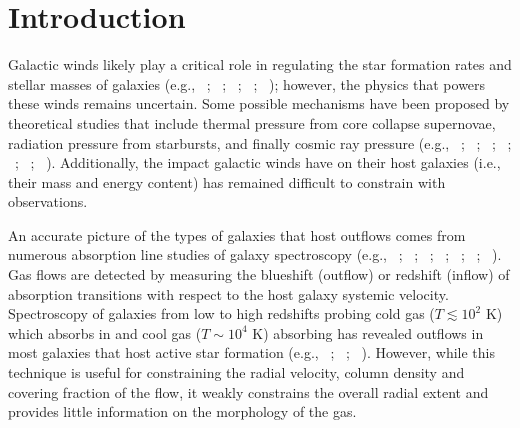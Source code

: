 \documentclass[twocolumn]{aastex62}
\newcommand{\citethnop}[1]{\citeauthor{#1}\ \citeyear{#1}}
\begin{document}

\section{Introduction}\label{sec:intro}
Galactic winds likely play a critical role in regulating the star formation rates and stellar masses of galaxies (e.g., \citethnop{SP1999}; \citethnop{Keres2009}; \citethnop{Oppenheimer2010}; \citethnop{Hopkins2014}; \citethnop{Werk_2014}); however, the physics that powers these winds remains uncertain. Some possible mechanisms have been proposed by theoretical studies that include thermal pressure from core collapse supernovae, radiation pressure from starbursts, and finally cosmic ray pressure (e.g., \citethnop{Larson_1974}; \citethnop{MO1977}; \citethnop{Chevalier_1985}; \citethnop{Breitschwerdt1991}; \citethnop{Springel_2003}; \citethnop{Murray2011}; \citethnop{Uhlig2012}).
Additionally, the impact galactic winds have on their host galaxies (i.e., their mass and energy content) has remained difficult to constrain with observations.

An accurate picture of the types of galaxies that host outflows comes from numerous absorption line studies of galaxy spectroscopy 
(e.g., \citethnop{Heckman2000}; \citethnop{Shapley2003}; \citethnop{Rupke2005b}; \citethnop{Veilleux2005}; \citethnop{Weiner2009}; \citethnop{Martin2012}; \citethnop{Rubin_2014}). Gas flows are detected by measuring the blueshift (outflow) or redshift (inflow) of absorption transitions with respect to the host galaxy systemic velocity. Spectroscopy of galaxies from low to high redshifts probing cold gas ($T \lesssim 10^2$ K) which absorbs in  and cool gas ($T \sim 10^4$ K) absorbing  has revealed outflows in most galaxies that host active star formation (e.g., \citethnop{chen2010}; \citethnop{Martin2012}; \citethnop{Rubin_2014}).
However, while this technique is useful for constraining the radial velocity, column density and covering fraction of the flow, it weakly constrains the overall radial extent and provides little information on the morphology of the gas.
\end{document}
